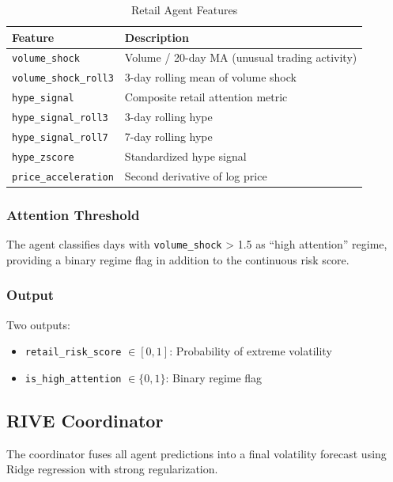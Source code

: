 \documentclass[12pt,a4paper]{article}
\begin{document}
\begin{table}[H]
\centering
\begin{tabular}{ll}
\toprule
\textbf{Feature} & \textbf{Description} \\
\midrule
\texttt{volume\_shock} & Volume / 20-day MA (unusual trading activity) \\
\texttt{volume\_shock\_roll3} & 3-day rolling mean of volume shock \\
\texttt{hype\_signal} & Composite retail attention metric \\
\texttt{hype\_signal\_roll3} & 3-day rolling hype \\
\texttt{hype\_signal\_roll7} & 7-day rolling hype \\
\texttt{hype\_zscore} & Standardized hype signal \\
\texttt{price\_acceleration} & Second derivative of log price \\
\bottomrule
\end{tabular}
\caption{Retail Agent Features}
\label{tab:retail_features}
\end{table}

\subsubsection{Attention Threshold}

The agent classifies days with \texttt{volume\_shock} > 1.5 as ``high attention'' regime, providing a binary regime flag in addition to the continuous risk score.

\subsubsection{Output}

Two outputs:
\begin{itemize}
    \item \texttt{retail\_risk\_score} $\in [0, 1]$: Probability of extreme volatility
    \item \texttt{is\_high\_attention} $\in \{0, 1\}$: Binary regime flag
\end{itemize}

\subsection{RIVE Coordinator}

The coordinator fuses all agent predictions into a final volatility forecast using Ridge regression with strong regularization.
\end{document}
